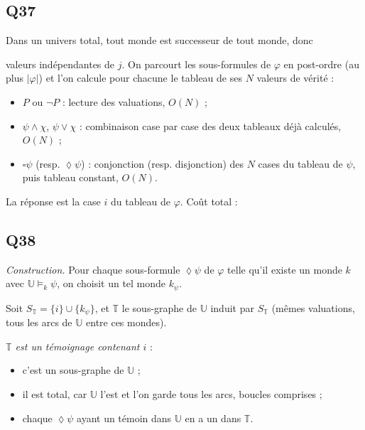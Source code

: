 \documentclass[11pt,a4paper]{article}
\providecommand{\tightlist}{\setlength{\itemsep}{0pt}\setlength{\parskip}{0pt}}
\providecommand{\Box}{\square}
\providecommand{\Diamond}{\lozenge}
\newcommand{\equationajustee}[1]{%
  \sbox{\boiteequation}{$\displaystyle #1$}%
  \ifdim\wd\boiteequation>\linewidth
    \[\resizebox{\linewidth}{!}{\usebox{\boiteequation}}\]%
  \else
    \[#1\]%
  \fi}
\begin{document}
\hypertarget{q37}{%
\subsection{Q37}\label{q37}}

Dans un univers total, tout monde est successeur de tout monde, donc

\equationajustee{
\begin{aligned}
\mathbb U\models_j\Box\psi&\iff\forall k,\ \mathbb U\models_k\psi\\
\mathbb U\models_j\Diamond\psi&\iff\exists k,\ \mathbb U\models_k\psi
\end{aligned}
}

valeurs indépendantes de \(j\). On parcourt les sous-formules de \(\varphi\) en post-ordre (au plus \(|\varphi|\)) et l'on calcule pour chacune le tableau de ses \(N\) valeurs de vérité :

\begin{itemize}
\tightlist
\item
  \(P\) ou \(\neg P\) : lecture des valuations, \(O(N)\) ;
\item
  \(\psi\wedge\chi\), \(\psi\vee\chi\) : combinaison case par case des deux tableaux déjà calculés, \(O(N)\) ;
\item
  \(\Box\psi\) (resp. \(\Diamond\psi\)) : conjonction (resp. disjonction) des \(N\) cases du tableau de \(\psi\), puis tableau constant, \(O(N)\).
\end{itemize}

La réponse est la case \(i\) du tableau de \(\varphi\). Coût total :

\equationajustee{\boxed{O(N\,|\varphi|)}}

\hypertarget{q38}{%
\subsection{Q38}\label{q38}}

\emph{Construction.} Pour chaque sous-formule \(\Diamond\psi\) de \(\varphi\) telle qu'il existe un monde \(k\) avec \(\mathbb U\models_k\psi\), on choisit un tel monde \(k_\psi\).

Soit \(S_{\mathbb T}=\{i\}\cup\{k_\psi\}\), et \(\mathbb T\) le sous-graphe de \(\mathbb U\) induit par \(S_{\mathbb T}\) (mêmes valuations, tous les arcs de \(\mathbb U\) entre ces mondes).

\emph{\(\mathbb T\) est un témoignage contenant \(i\)} :

\begin{itemize}
\tightlist
\item
  c'est un sous-graphe de \(\mathbb U\) ;
\item
  il est total, car \(\mathbb U\) l'est et l'on garde tous les arcs, boucles comprises ;
\item
  chaque \(\Diamond\psi\) ayant un témoin dans \(\mathbb U\) en a un dans \(\mathbb T\).
\end{itemize}
\end{document}
